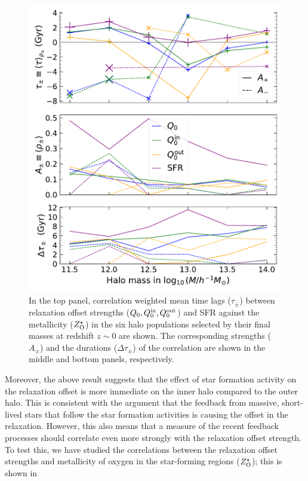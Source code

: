 \begin{figure}[htbp]
\centering
\includegraphics[width=.69\linewidth]{plots/dynam_relxn/shift_betw_multi-Z(O)_SFreg_fullcorr.pdf}
\caption{In the top panel, correlation weighted mean time lags ($\tau_{\pm}$) between relaxation offset strengths ($Q_0, Q_0^{\rm{in}}, Q_0^{\rm{out}}$) and SFR against the metallicity ($Z^{\star}_{\rm{O}}$) in the six halo populations selected by their final masses at redshift $z\sim 0$ are shown. The corresponding strengths ($A_{\pm}$) and the durations ($\Delta \tau_{\pm}$) of the correlation are shown in the middle and bottom panels, respectively.}
\label{fig:dynam-correl-q0-ZOsfr-timeshift-func}
\end{figure}

Moreover, the above result suggests that the effect of star formation activity on the relaxation offset is more immediate on the inner halo compared to the outer halo. This is consistent with the argument that the feedback from massive, short-lived stars that follow the star formation activities is causing the offset in the relaxation.  However, this also means that a measure of the recent feedback processes should correlate even more strongly with the relaxation offset strength. To test this, we have studied the correlations between the relaxation offset strengths and metallicity of oxygen in the star-forming regions ($Z^{\star}_{\rm{O}}$); this is shown in 

